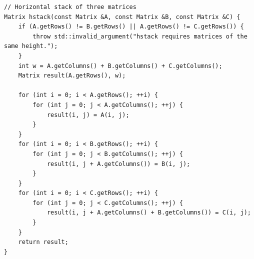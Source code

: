 \documentclass[12pt,twoside]{article}
\begin{document}
\begin{verbatim}
// Horizontal stack of three matrices
Matrix hstack(const Matrix &A, const Matrix &B, const Matrix &C) {
    if (A.getRows() != B.getRows() || A.getRows() != C.getRows()) {
        throw std::invalid_argument("hstack requires matrices of the same height.");
    }
    int w = A.getColumns() + B.getColumns() + C.getColumns();
    Matrix result(A.getRows(), w);

    for (int i = 0; i < A.getRows(); ++i) {
        for (int j = 0; j < A.getColumns(); ++j) {
            result(i, j) = A(i, j);
        }
    }
    for (int i = 0; i < B.getRows(); ++i) {
        for (int j = 0; j < B.getColumns(); ++j) {
            result(i, j + A.getColumns()) = B(i, j);
        }
    }
    for (int i = 0; i < C.getRows(); ++i) {
        for (int j = 0; j < C.getColumns(); ++j) {
            result(i, j + A.getColumns() + B.getColumns()) = C(i, j);
        }
    }
    return result;
}
\end{verbatim}
\end{document}
